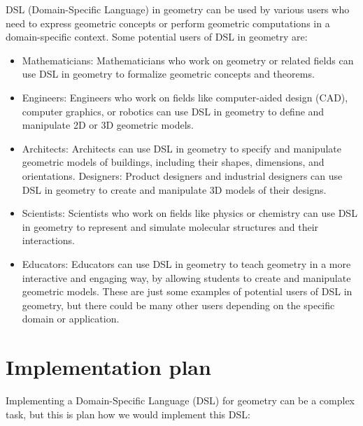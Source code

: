 DSL (Domain-Specific Language) in geometry can be used by various users who need to express geometric concepts or perform geometric computations in a domain-specific context. Some potential users of DSL in geometry are:
\begin{itemize}

\item Mathematicians: Mathematicians who work on geometry or related fields can use DSL in geometry to formalize geometric concepts and theorems.

\item Engineers: Engineers who work on fields like computer-aided design (CAD), computer graphics, or robotics can use DSL in geometry to define and manipulate 2D or 3D geometric models.

\item Architects: Architects can use DSL in geometry to specify and manipulate geometric models of buildings, including their shapes, dimensions, and orientations.
Designers: Product designers and industrial designers can use DSL in geometry to create and manipulate 3D models of their designs.

\item Scientists: Scientists who work on fields like physics or chemistry can use DSL in geometry to represent and simulate molecular structures and their interactions.

\item Educators: Educators can use DSL in geometry to teach geometry in a more interactive and engaging way, by allowing students to create and manipulate geometric models.
These are just some examples of potential users of DSL in geometry, but there could be many other users depending on the specific domain or application.

\end{itemize}

\section{Implementation plan}
\noindent Implementing a Domain-Specific Language (DSL) for geometry can be a complex task, but this is plan how we would implement this DSL:

